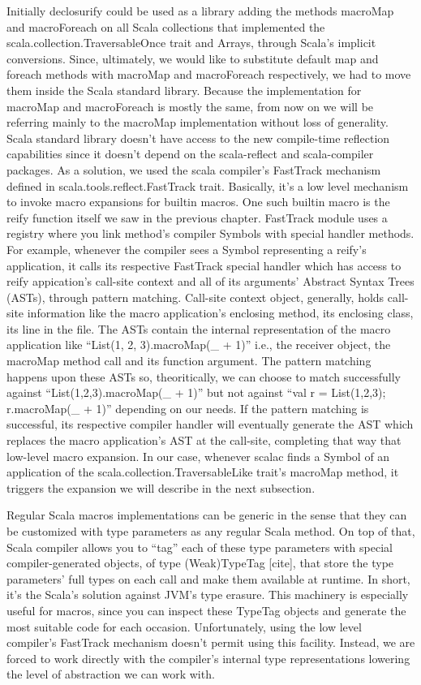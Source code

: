 Initially declosurify could be used as a library adding the methods macroMap
and macroForeach on all Scala collections that implemented the
scala.collection.TraversableOnce trait and Arrays, through Scala's implicit
conversions. Since, ultimately, we would like to substitute default map and
foreach methods with macroMap and macroForeach respectively, we had to move them
inside the Scala standard library. Because the implementation for macroMap and
macroForeach is mostly the same, from now on we will be referring mainly to the
macroMap implementation without loss of generality. Scala
standard library doesn't have access to
the new compile-time reflection capabilities since it doesn't depend on the
scala-reflect and scala-compiler packages. As a solution, we used the scala
compiler's FastTrack mechanism defined in scala.tools.reflect.FastTrack
trait. Basically, it's a low level mechanism to invoke macro expansions for
builtin macros. One such builtin macro is the reify function itself  we saw in
the previous chapter. FastTrack module uses a registry where you link
method's compiler Symbols with special handler methods. For example, whenever
the compiler sees a Symbol representing a reify's application, it calls its
respective FastTrack special handler which has access to reify appication's
call-site context and all of  its arguments' Abstract Syntax Trees (ASTs),
through pattern matching. Call-site context object, generally, holds call-site
information like the macro application's enclosing method, its enclosing class,
its line in the file. The ASTs contain the internal representation of the macro
application like ``List(1, 2, 3).macroMap(_ + 1)'' i.e., the receiver object,
the macroMap method call and its function argument. The pattern
matching happens upon these ASTs so, theoritically, we can choose to match
successfully against ``List(1,2,3).macroMap(_ + 1)'' but not against ``val r =
List(1,2,3); r.macroMap(_ + 1)'' depending on our needs. If the pattern matching
is successful, its respective compiler handler will eventually generate the AST
which replaces the macro application's AST at the call-site, completing that way
that low-level macro expansion. In our case, whenever scalac finds a Symbol of
an application of the scala.collection.TraversableLike trait's macroMap
method, it triggers the expansion we will describe in the next
subsection.

Regular Scala macros implementations can be generic in the sense that they can
be customized with type parameters as any regular Scala method. On top of that,
Scala compiler allows you to ``tag'' each of these type parameters with special
compiler-generated objects, of type (Weak)TypeTag [cite], that store the type
parameters' full types on each call and make them available at runtime. In
short, it's the Scala's solution against JVM's type erasure. This machinery is
especially useful for macros, since you can inspect these TypeTag objects and
generate the most suitable code for each occasion. Unfortunately, using the low
level compiler's FastTrack mechanism doesn't permit using this facility.
Instead, we are forced to work directly with the compiler's internal type
representations lowering the level of abstraction we can work with.

